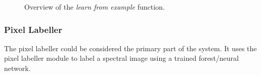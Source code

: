 \documentclass[12pt,twoside,notitlepage]{report}
\begin{document}
\begin{figure}[H]
{\begin{tikzpicture}[node distance=2cm,>=stealth',bend angle=45,auto]
                                    
                            \end{tikzpicture}
                        }

                    \caption{Overview of the \textit{learn from example} function.}
                \end{figure} 




            \subsubsection{Pixel Labeller}
                The pixel labeller could be considered the primary part of the system. It uses the pixel labeller 
                module to label a spectral image using a trained forest/neural network.
\end{document}
